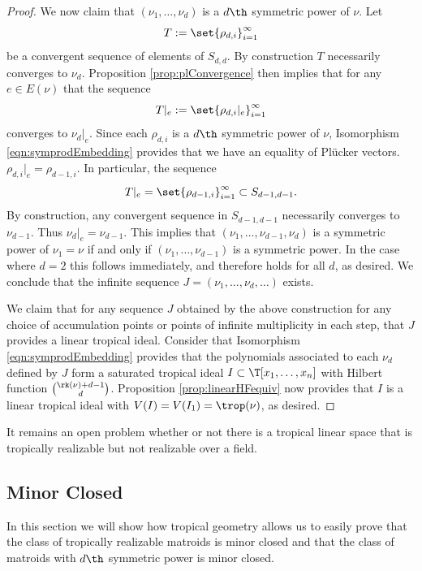 \begin{proof}
We now claim that $(\nu_1,\dots,\nu_d)$ is a $d\th$ symmetric power of $\nu$. Let 
$$T:=\set{\rho_{d,i}}_{i=1}^\infty$$
be a convergent sequence of elements of $S_{d,d}$. By construction $T$ necessarily converges to $\nu_d$. Proposition \ref{prop:plConvergence} then implies that for any $e \in E(\nu)$ that the sequence
$$T|_e:=\set{\rho_{d,i}|_{e}}_{i=1}^\infty$$
converges to $\nu_d|_e$. Since each $\rho_{d,i}$ is a $d\th$ symmetric power of $\nu$, Isomorphism \ref{eqn:symprodEmbedding} provides that we have an equality of Pl\"ucker vectors. $\rho_{d,i}|_{e}=\rho_{d-1,i}$.
In particular, the sequence
$$T|_e = \set{\rho_{d-1,i}}_{i=1}^\infty\subset S_{d-1,d-1}.$$
By construction, any convergent sequence in $S_{d-1,d-1}$ necessarily converges to $\nu_{d-1}$. Thus $\nu_d|_e=\nu_{d-1}$. This implies that $(\nu_1,\dots,\nu_{d-1},\nu_d)$ is a symmetric power of $\nu_1=\nu$ if and only if $(\nu_1,\dots,\nu_{d-1})$ is a symmetric power. In the case where $d=2$ this follows immediately, and therefore holds for all $d$, as desired. We conclude that the infinite sequence $J=(\nu_1,\dots,\nu_d, \dots)$ exists.

We claim that for any sequence $J$ obtained by the above construction for any choice of accumulation points or points of infinite multiplicity in each step, that $J$ provides a linear tropical ideal. Consider that Isomorphism \ref{eqn:symprodEmbedding} provides that the polynomials associated to each $\nu_d$ defined by $J$ form a saturated tropical ideal $I\subset \T[x_1,\dots,x_n]$ with Hilbert function $\binom{\rk(\nu)+d-1}{d}$. Proposition \ref{prop:linearHFequiv} now provides that $I$ is a linear tropical ideal with $V(I)=V(I_1)=\trop(\nu)$, as desired.
\end{proof}

\begin{remark}
It remains an open problem whether or not there is a tropical linear space that is tropically realizable but not realizable over a field. 
\end{remark}

\subsection{Minor Closed}\label{subsec:MinorClosed}
    In this section we will show how tropical geometry allows us to easily prove that the class of tropically realizable matroids is minor closed and that the class of matroids with $d\th$ symmetric power is minor closed.
    
